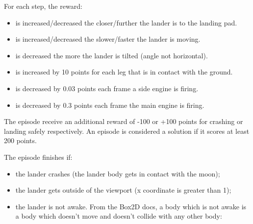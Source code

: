 \documentclass{article}
\begin{document}
For each step, the reward:
\begin{itemize}
  \item is increased/decreased the closer/further the lander is to the landing pad.
  \item is increased/decreased the slower/faster the lander is moving.
  \item is decreased the more the lander is tilted (angle not horizontal).
  \item is increased by 10 points for each leg that is in contact with the ground.
  \item is decreased by 0.03 points each frame a side engine is firing.
  \item is decreased by 0.3 points each frame the main engine is firing.
\end{itemize}

The episode receive an additional reward of -100 or +100 points for crashing or landing safely respectively. An episode is considered a solution if it scores at least 200 points.

The episode finishes if:
\begin{itemize}
  \item the lander crashes (the lander body gets in contact with the moon);
  \item the lander gets outside of the viewport (x coordinate is greater than 1);
  \item the lander is not awake. From the Box2D docs, a body which is not awake is a body which doesn’t move and doesn’t collide with any other body:
\end{itemize}
\end{document}
